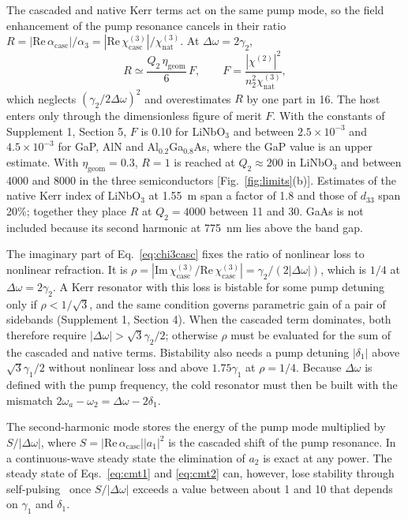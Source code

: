 \documentclass{optica-article}
\newcommand{\chitwo}{\chi^{(2)}}
\newcommand{\chicasc}{\chi^{(3)}_{\mathrm{casc}}}
\newcommand{\chinat}{\chi^{(3)}_{\mathrm{nat}}}
\newcommand{\Dom}{\Delta\omega}
\newcommand{\etag}{\eta_{\mathrm{geom}}}
\begin{document}
The cascaded and native Kerr terms act on the same pump mode, so the field
enhancement of the pump resonance cancels in their ratio
$R=|\mathrm{Re}\,\alpha_{\mathrm{casc}}|/\alpha_3=|\mathrm{Re}\,\chicasc|/\chinat$.
At $\Dom=2\gamma_2$,
\begin{equation}
  R\simeq\frac{Q_2\,\etag}{6}\,F,\qquad F=\frac{|\chitwo|^2}{n_2^2\chinat},
  \label{eq:R}
\end{equation}
which neglects $(\gamma_2/2\Dom)^2$ and overestimates $R$ by one part in 16.  The host
enters only through the dimensionless figure of merit $F$.  With the
constants of Supplement 1, Section 5, $F$ is 0.10 for LiNbO$_3$ and between
$2.5\times10^{-3}$ and $4.5\times10^{-3}$ for GaP, AlN and
Al$_{0.2}$Ga$_{0.8}$As, where the GaP value is an upper estimate.  With $\etag=0.3$, $R=1$ is reached at
$Q_2\approx200$ in LiNbO$_3$ and between 4000 and 8000 in
the three semiconductors [Fig.~\ref{fig:limits}(b)].  Estimates of the native
Kerr index of LiNbO$_3$ at 1.55~\textmu m span a factor of 1.8 and those of
$d_{33}$ span 20\%; together they place $R$ at $Q_2=4000$ between 11 and 30.  GaAs is not included because its second
harmonic at 775~nm lies above the band gap.

The imaginary part of Eq.~\eqref{eq:chi3casc} fixes the ratio of nonlinear
loss to nonlinear refraction.  It is
$\rho=|\mathrm{Im}\,\chicasc/\mathrm{Re}\,\chicasc|=\gamma_2/(2|\Dom|)$,
which is $1/4$ at $\Dom=2\gamma_2$.  A Kerr resonator with this loss is
bistable for some pump detuning only if $\rho<1/\sqrt3$, and the same
condition governs parametric gain of a pair of sidebands (Supplement 1,
Section 4).  When the cascaded term dominates, both therefore require
$|\Dom|>\sqrt3\gamma_2/2$; otherwise $\rho$ must be evaluated for the sum of the
cascaded and native terms.  Bistability also needs a pump detuning
$|\delta_1|$ above $\sqrt3\gamma_1/2$ without nonlinear loss and above $1.75\gamma_1$
at $\rho=1/4$.  Because $\Dom$ is defined with the pump frequency, the cold
resonator must then be built with the mismatch
$2\omega_a-\omega_2=\Dom-2\delta_1$.

The second-harmonic mode stores the energy of the pump mode multiplied by
$S/|\Dom|$, where $S=|\mathrm{Re}\,\alpha_{\mathrm{casc}}||a_1|^2$ is the
cascaded shift of the pump resonance.  In a continuous-wave steady state the
elimination of $a_2$ is exact at any power.  The steady state of
Eqs.~\eqref{eq:cmt1} and \eqref{eq:cmt2} can, however, lose stability through
self-pulsing~\cite{drummond1980} once $S/|\Dom|$ exceeds a value between
about 1 and 10 that depends on $\gamma_1$ and $\delta_1$.
\end{document}
